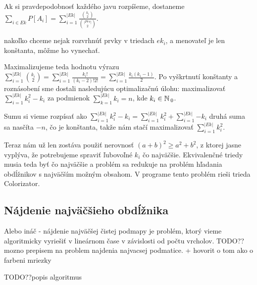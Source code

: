 Ak si pravdepodobnosť každého javu rozpíšeme, dostaneme 
$\sum_{i \in Ek}P[A_i] = \sum_{i = 1}^{|Ek|} \frac{{{k_i} \choose {2}}}{{{|Prv|} \choose {2}}}$.


nakoľko chceme nejak rozvrhnúť prvky v triedach $ek_i$, a menovateľ je len
konštanta, môžme ho vynechať.

Maximalizujeme teda hodnotu výrazu 
$\sum_{i = 1}^{|Ek|} {{k_i} \choose {2}} = \sum_{i = 1}^{|Ek|} {\frac{k_i!}{(k_i -2 )!2!}} = \sum_{i = 1}^{|Ek|}{\frac{k_i (k_i-1)}{2}}$.
Po vyškrtnutí konštanty a roznásobení sme dostali nasledujúcu optimalizačnú úlohu:
maximalizovať $\sum_{i = 1}^{|Ek|} {k_i^2 - k_i}$ za podmienok $\sum_{k=1}^{|Ek|}k_i = n$,
kde $k_i \in \mathbb{N}\,_0$.

Sumu si vieme rozpísať ako 
$\sum_{i = 1}^{|Ek|} {k_i^2 - k_i} = \sum_{i = 1}^{|Ek|} {k_i^2} + \sum_{i = 1}^{|Ek|}{-k_i}$
druhá suma sa nasčíta $-n$, čo je konštanta, takže nám stačí maximalizovať 
$\sum_{i = 1}^{|Ek|} {k_i^2}$.

Teraz nám už len zostáva použiť nerovnosť
$(a+b)^2 \geq a^2 + b^2$, z ktorej jasne vyplýva, že potrebujeme spraviť ľubovoľné $k_i$ čo najväčšie.
Ekvivalenčné triedy musia teda byť čo najväčšie a problém sa redukuje na problém hľadania
obdĺžnikov s najväčším možným obsahom.
V programe tento problém rieši trieda Colorizator.


\subsection{Nájdenie najväčšieho obdĺžnika}
Alebo ináč - nájdenie najväčšej čistej podmapy je problém, ktorý vieme algoritmicky vyriešiť v lineárnom čase v závislosti od počtu vrcholov.
TODO?? mozno prepisem na problem najdenia najvacsej podmatice. + hovorit o tom ako o farbeni mriezky

TODO??popis algoritmus




